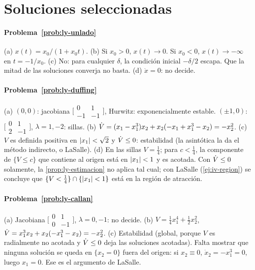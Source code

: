 \section{Soluciones seleccionadas}

\paragraph{Problema~\ref{prob:ly-unlado}}
(a) $x(t)=x_0/(1+x_0t)$. (b) Si $x_0>0$, $x(t)\to0$. Si $x_0<0$, $x(t)\to-\infty$ en $t=-1/x_0$. (c) No: para cualquier $\delta$, la condición inicial $-\delta/2$ escapa. Que la mitad de las soluciones converja no basta. (d) $\dot x=0$: no decide.

\paragraph{Problema~\ref{prob:ly-duffing}}
(a) $(0,0)$: jacobiana $\bigl[\begin{smallmatrix}0&1\\-1&-1\end{smallmatrix}\bigr]$, Hurwitz: exponencialmente estable. $(\pm1,0)$: $\bigl[\begin{smallmatrix}0&1\\2&-1\end{smallmatrix}\bigr]$, $\lambda=1,-2$: sillas. (b) $\dot V=(x_1-x_1^3)x_2+x_2(-x_1+x_1^3-x_2)=-x_2^2$. (c) $V$ es definida positiva en $\left\lvert x_1\right\rvert<\sqrt2$ y $\dot V\le0$: estabilidad (la asintótica la da el método indirecto, o LaSalle). (d) En las sillas $V=\tfrac14$; para $c<\tfrac14$, la componente de $\{V\le c\}$ que contiene al origen está en $\left\lvert x_1\right\rvert<1$ y es acotada. Con $\dot V\le0$ solamente, la \cref{prop:ly-estimacion} no aplica tal cual; con LaSalle (\cref{ej:iv-region}) se concluye que $\{V<\tfrac14\}\cap\{\left\lvert x_1\right\rvert<1\}$ está en la región de atracción.

\paragraph{Problema~\ref{prob:ly-callan}}
(a) Jacobiana $\bigl[\begin{smallmatrix}0&1\\0&-1\end{smallmatrix}\bigr]$, $\lambda=0,-1$: no decide. (b) $V=\tfrac14x_1^4+\tfrac12x_2^2$, $\dot V=x_1^3x_2+x_2(-x_1^3-x_2)=-x_2^2$. (c) Estabilidad (global, porque $V$ es radialmente no acotada y $\dot V\le0$ deja las soluciones acotadas). Falta mostrar que ninguna solución se queda en $\{x_2=0\}$ fuera del origen: si $x_2\equiv0$, $\dot x_2=-x_1^3=0$, luego $x_1=0$. Ese es el argumento de LaSalle.

